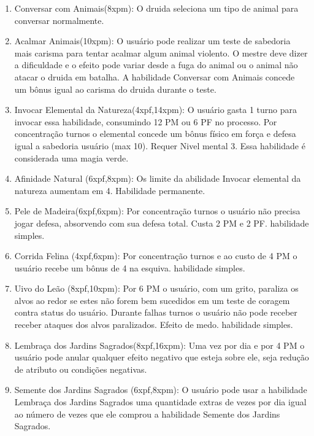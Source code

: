 \begin{enumerate}

  	\item Conversar com Animais(8xpm): O druida seleciona um tipo de animal para conversar normalmente. 
  	
  	\item Acalmar Animais(10xpm): O usuário pode realizar um teste de sabedoria mais carisma para tentar acalmar algum animal violento. O mestre deve dizer a dificuldade e o efeito pode variar desde a fuga do animal ou o animal não atacar o druida em batalha. A habilidade Conversar com Animais concede um bônus igual ao carisma do druida durante o teste.
  
  	\item Invocar Elemental da Natureza(4xpf,14xpm): O usuário gasta 1 turno para invocar essa habilidade, consumindo 12 PM ou 6 PF no processo. Por concentração turnos o elemental concede um bônus físico em força e defesa igual a sabedoria usuário (max 10). Requer Nivel mental 3. Essa habilidade é considerada uma magia verde.

		\item Afinidade Natural (6xpf,8xpm): Os limite da abilidade Invocar elemental da natureza aumentam em 4. Habilidade permanente.
  	
  	\item Pele de Madeira(6xpf,6xpm): Por concentração turnos o usuário não precisa jogar defesa, absorvendo com sua defesa total. Custa 2 PM e 2 PF. habilidade simples.
  
	\item Corrida Felina (4xpf,6xpm):  Por concentração turnos e ao custo de 4 PM o usuário recebe um bônus de 4 na esquiva. habilidade simples.

		\item Uivo do Leão (8xpf,10xpm): Por 6 PM o usuário, com um grito, paraliza os alvos ao redor se estes não forem bem sucedidos em um teste de coragem contra status do usuário. Durante falhas turnos o usuário não pode receber receber ataques dos alvos paralizados. Efeito de medo. habilidade simples.

  	 
			\item Lembraça dos Jardins Sagrados(8xpf,16xpm): Uma vez por dia e por 4 PM o usuário pode anular qualquer efeito negativo que esteja sobre ele, seja redução de atributo ou condições negativas.

			  \item Semente dos Jardins Sagrados (6xpf,8xpm): O usuário pode usar a habilidade Lembraça dos Jardins Sagrados uma quantidade extras de vezes por dia igual ao número de vezes que ele comprou a habilidade Semente dos Jardins Sagrados.
  

\end{enumerate}
